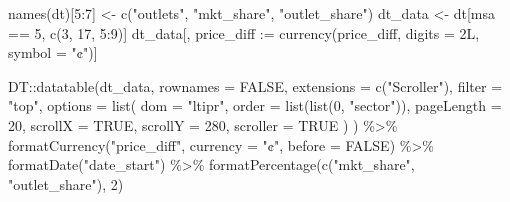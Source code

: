 \documentclass[
  letterpaper,
  DIV=11,
  numbers=noendperiod]{scrartcl}
\newenvironment{Shaded}{\begin{snugshade}}{\end{snugshade}}
\newcommand{\AttributeTok}[1]{\textcolor[rgb]{0.40,0.45,0.13}{#1}}
\newcommand{\ConstantTok}[1]{\textcolor[rgb]{0.56,0.35,0.01}{#1}}
\newcommand{\DecValTok}[1]{\textcolor[rgb]{0.68,0.00,0.00}{#1}}
\newcommand{\ErrorTok}[1]{\textcolor[rgb]{0.68,0.00,0.00}{#1}}
\newcommand{\FunctionTok}[1]{\textcolor[rgb]{0.28,0.35,0.67}{#1}}
\newcommand{\NormalTok}[1]{\textcolor[rgb]{0.00,0.23,0.31}{#1}}
\newcommand{\OtherTok}[1]{\textcolor[rgb]{0.00,0.23,0.31}{#1}}
\newcommand{\SpecialCharTok}[1]{\textcolor[rgb]{0.37,0.37,0.37}{#1}}
\newcommand{\StringTok}[1]{\textcolor[rgb]{0.13,0.47,0.30}{#1}}
\begin{document}
\begin{Shaded}
\begin{Highlighting}[]
\FunctionTok{names}\NormalTok{(dt)[}\DecValTok{5}\SpecialCharTok{:}\DecValTok{7}\NormalTok{] }\OtherTok{\textless{}{-}} \FunctionTok{c}\NormalTok{(}\StringTok{"outlets"}\NormalTok{, }\StringTok{"mkt\_share"}\NormalTok{, }\StringTok{"outlet\_share"}\NormalTok{)}
\NormalTok{dt\_data }\OtherTok{\textless{}{-}}\NormalTok{ dt[msa }\SpecialCharTok{==} \DecValTok{5}\NormalTok{, }\FunctionTok{c}\NormalTok{(}\DecValTok{3}\NormalTok{, }\DecValTok{17}\NormalTok{, }\DecValTok{5}\SpecialCharTok{:}\DecValTok{9}\NormalTok{)]}
\NormalTok{dt\_data[, price\_diff }\SpecialCharTok{:}\ErrorTok{=} \FunctionTok{currency}\NormalTok{(price\_diff, }\AttributeTok{digits =}\NormalTok{ 2L, }\AttributeTok{symbol =} \StringTok{"¢"}\NormalTok{)]}

\NormalTok{DT}\SpecialCharTok{::}\FunctionTok{datatable}\NormalTok{(dt\_data,}
  \AttributeTok{rownames =} \ConstantTok{FALSE}\NormalTok{,}
  \AttributeTok{extensions =} \FunctionTok{c}\NormalTok{(}\StringTok{"Scroller"}\NormalTok{),}
  \AttributeTok{filter =} \StringTok{"top"}\NormalTok{,}
  \AttributeTok{options =} \FunctionTok{list}\NormalTok{(}
    \AttributeTok{dom =} \StringTok{"ltipr"}\NormalTok{,}
    \AttributeTok{order =} \FunctionTok{list}\NormalTok{(}\FunctionTok{list}\NormalTok{(}\DecValTok{0}\NormalTok{, }\StringTok{"sector"}\NormalTok{)),}
    \AttributeTok{pageLength =} \DecValTok{20}\NormalTok{,}
    \AttributeTok{scrollX =} \ConstantTok{TRUE}\NormalTok{,}
    \AttributeTok{scrollY =} \DecValTok{280}\NormalTok{,}
    \AttributeTok{scroller =} \ConstantTok{TRUE}
\NormalTok{  )}
\NormalTok{) }\SpecialCharTok{\%\textgreater{}\%}
  \FunctionTok{formatCurrency}\NormalTok{(}\StringTok{"price\_diff"}\NormalTok{, }\AttributeTok{currency =} \StringTok{"¢"}\NormalTok{, }\AttributeTok{before =} \ConstantTok{FALSE}\NormalTok{) }\SpecialCharTok{\%\textgreater{}\%}  
  \FunctionTok{formatDate}\NormalTok{(}\StringTok{"date\_start"}\NormalTok{) }\SpecialCharTok{\%\textgreater{}\%}
  \FunctionTok{formatPercentage}\NormalTok{(}\FunctionTok{c}\NormalTok{(}\StringTok{"mkt\_share"}\NormalTok{, }\StringTok{"outlet\_share"}\NormalTok{), }\DecValTok{2}\NormalTok{)}
\end{Highlighting}
\end{Shaded}
\end{document}
